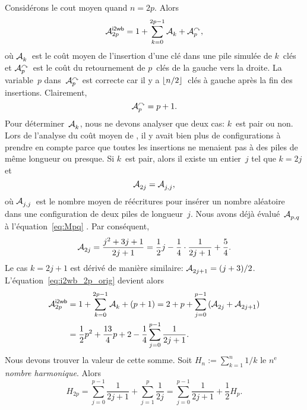 Considérons le cout moyen quand \(n=2p\). Alors
\begin{equation}
\M{\fun{i2wb}}{2p} =
  1 + \sum_{k=0}^{2p-1}{\M{}{k}} + \M{\curvearrowright}{p},
\label{eq:i2wb_2p_orig}
\end{equation}
où \(\mathcal{A}_{k}^{}\)~est le coût moyen de l'insertion d'une clé dans une
pile simulée de \(k\)~clés et
\(\mathcal{A}_{p}^{\curvearrowright}\)~est
le coût du retournement de \(p\)~clés de la gauche vers la droite. La
variable~\(p\) dans~\(\mathcal{A}_{p}^{\curvearrowright}\) est correcte car il y
a \(\lfloor{n/2}\rfloor\)~clés à gauche après la fin des
insertions. Clairement,
\begin{equation*}
\mathcal{A}_{p}^{\curvearrowright} = p + 1.
\end{equation*}
Pour déterminer~\(\mathcal{A}_{k}^{}\), nous ne devons analyser que deux cas:
\(k\)~est pair ou non. Lors de l'analyse du coût moyen de ,
il y avait bien plus de configurations à prendre en compte parce que
toutes les insertions ne menaient pas à des piles de même longueur ou
presque. Si \(k\)~est pair, alors il existe un entier~\(j\) tel que
\(k=2j\) et
\begin{equation*}
\mathcal{A}_{2j}^{} = \mathcal{A}_{j,j}^{},
\end{equation*}
où \(\mathcal{A}_{j,j}^{}\)~est le nombre moyen de réécritures pour insérer un
nombre aléatoire dans une configuration de deux piles de
longueur~\(j\). Nous avons déjà évalué~\(\mathcal{A}_{p,q}^{}\) à
l'équation~\eqref{eq:Mpq} . Par conséquent,
\begin{equation*}
\mathcal{A}_{2j}^{} = \frac{j^2 + 3j + 1}{2j+1}
         = \frac{1}{2}{j} - \frac{1}{4} \cdot \frac{1}{2j+1} +
         \frac{5}{4}.
\end{equation*}
Le cas \(k=2j+1\) est dérivé de manière similaire: \(\mathcal{A}_{2j+1}^{} =
(j+3)/2\). L'équation~\eqref{eq:i2wb_2p_orig} devient alors
\begin{align}
\M{\fun{i2wb}}{2p}
  &= 1 + \sum_{k=0}^{2p-1}{\M{}{k}} + (p+1)
   = 2 + p + \sum_{j=0}^{p-1}{(\M{}{2j} + \M{}{2j+1})}\notag\\
  &= \frac{1}{2}{p^2} + \frac{13}{4}{p} + 2 -
             \frac{1}{4}\sum_{j=0}^{p-1}{\frac{1}{2j+1}}.
\label{eq:i2wb_2p}
\end{align}
Nous devons trouver la valeur de cette somme. Soit \(H_n :=
\sum_{k=1}^n{1/k}\) le \(n^\text{e}\) \emph{nombre
  harmonique}. Alors
\begin{equation*}
H_{2p} = \sum_{j=0}^{p-1}{\frac{1}{2j+1}} + \sum_{j=1}^{p}{\frac{1}{2j}}
      = \sum_{j=0}^{p-1}{\frac{1}{2j+1}} + \frac{1}{2}{H_{p}}.
\end{equation*}
